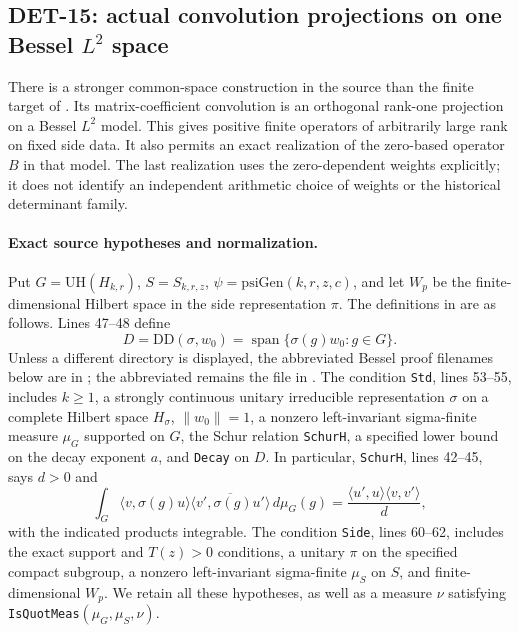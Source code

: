 \subsection{DET-15: actual convolution projections on one Bessel \texorpdfstring{$L^2$}{L2} space}
There is a stronger common-space construction in the source than the
finite target of . Its matrix-coefficient convolution is
an orthogonal rank-one projection on a Bessel \(L^2\) model.
This gives positive finite operators of arbitrarily large rank on
fixed side data. It also permits an exact realization of the
zero-based operator \(B\) in that model. The last realization uses
the zero-dependent weights explicitly; it does not identify an
independent arithmetic choice of weights or the historical
determinant family.

\paragraph{Exact source hypotheses and normalization.}
Put \(G=\mathrm{UH}(H_{k,r})\), \(S=S_{k,r,z}\),
\(\psi=\mathrm{psiGen}(k,r,z,c)\), and let \(W_p\) be the finite-dimensional
Hilbert space in the side representation \(\pi\).
The definitions in
are as follows. Lines 47--48 define
\[
 D=\mathrm{DD}(\sigma,w_0)
 =\operatorname{span}\{\sigma(g)w_0:g\in G\}.
\]
Unless a different directory is displayed, the abbreviated Bessel
proof filenames below are in
;
the abbreviated  remains the file in
.
The condition \texttt{Std}, lines 53--55, includes \(k\ge1\), a
strongly continuous unitary irreducible representation \(\sigma\)
on a complete Hilbert space \(H_\sigma\), \(\|w_0\|=1\), a nonzero
left-invariant sigma-finite measure \(\mu_G\) supported on \(G\),
the Schur relation \texttt{SchurH}, a specified lower bound on
the decay exponent \(a\), and \texttt{Decay} on \(D\).
In particular, \texttt{SchurH}, lines 42--45, says \(d>0\) and
\[
 \int_G
 \langle v,\sigma(g)u\rangle
 \overline{\langle v',\sigma(g)u'\rangle}\,d\mu_G(g)
 =\frac{\langle u',u\rangle\langle v,v'\rangle}{d},
\]
with the indicated products integrable.
The condition \texttt{Side}, lines 60--62, includes the exact
support and \(T(z)>0\) conditions, a unitary \(\pi\) on the
specified compact subgroup, a nonzero left-invariant sigma-finite
\(\mu_S\) on \(S\), and finite-dimensional \(W_p\).
We retain all these hypotheses, as well as a measure \(\nu\)
satisfying \texttt{IsQuotMeas}\((\mu_G,\mu_S,\nu)\).

